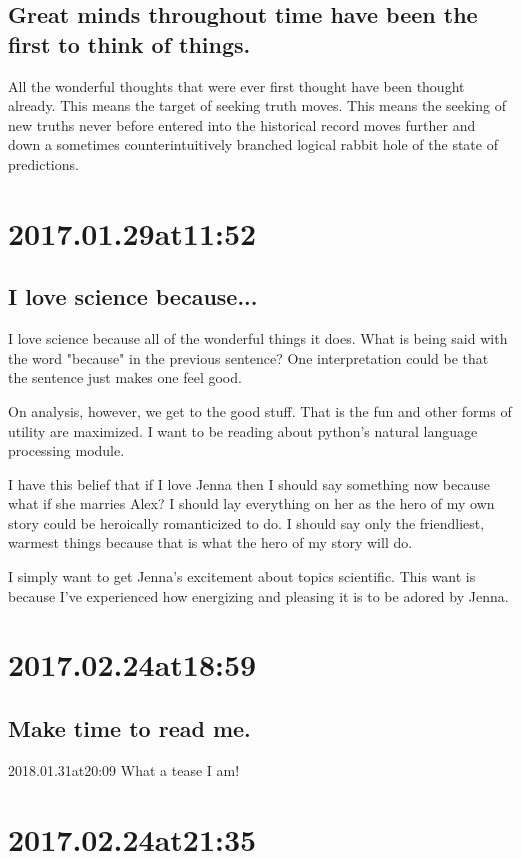 \begin{enumerate}
\begin{enumerate}
\subsection*{ Great minds throughout time have been the first to think of things. }
All the wonderful thoughts that were ever first thought have been thought already.
This means the target of seeking truth moves.
This means the seeking of new truths never before entered into the historical record moves further and down a sometimes counterintuitively branched logical rabbit hole of the state of predictions.

\section*{ 2017.01.29at11:52 }
\subsection*{ I love science because... }
I love science because all of the wonderful things it does.
What is being said with the word "because" in the previous sentence?
One interpretation could be that the sentence just makes one feel good.

On analysis, however, we get to the good stuff.
That is the fun and other forms of utility are maximized.
I want to be reading about python's natural language processing module.

I have this belief that if I love Jenna then I should say something now because what if she marries Alex?
I should lay everything on her as the hero of my own story could be heroically romanticized to do.
I should say only the friendliest, warmest things because that is what the hero of my story will do.

I simply want to get Jenna's excitement about topics scientific.
This want is because I've experienced how energizing and pleasing it is to be adored by Jenna. 

\section*{ 2017.02.24at18:59 }
\subsection*{ Make time to read me. }
2018.01.31at20:09 What a tease I am!

\section*{ 2017.02.24at21:35 }

\end{enumerate}
\end{enumerate}
